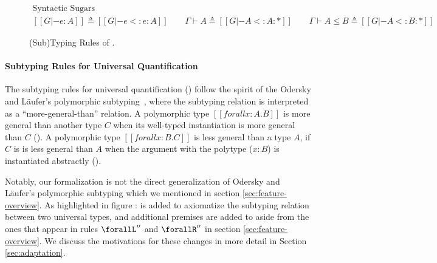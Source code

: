 \begin{figure}
    \setlength{\abovedisplayskip}{0pt}
    \setlength{\abovedisplayshortskip}{0pt}
    \begin{gather*}
       \text{Syntactic Sugars} \\
       [[G |- e : A]] \triangleq [[G |- e <: e : A]]
      \qquad \Gamma \vdash A \triangleq [[G |- A <: A : *]]
      \qquad \Gamma \vdash A \le B \triangleq [[G |- A <: B : *]]
    \end{gather*}
    \caption{(Sub)Typing Rules of \name.}
    \label{fig:typing}
\end{figure}

\paragraph{Subtyping Rules for Universal Quantification}
The subtyping rules for universal quantification () follow
the spirit of the Odersky and L\"aufer's polymorphic subtyping~\citep{odersky1996putting,dunfield2013complete},
where the subtyping relation is interpreted as a ``more-general-than'' relation.
A polymorphic type $[[forall x : A. B]]$
is more general than another type $C$ when its well-typed
instantiation is more general than $C$ (). A polymorphic
type $[[forall x : B. C]]$ is less general than a type $A$,
if $C$ is is less general than $A$ when the argument with the polytype ($x:B$)
is instantiated abstractly ().

Notably, our formalization is not the direct generalization of
Odersky and L\"aufer's polymorphic subtyping which we mentioned in section \ref{sec:feature-overview}.
As highlighted in figure \label{fig:typing}:
 is added to axiomatize the subtyping relation between two universal types,
and additional premises are added to  aside from the
ones that appear in rules $\forallL''$ and $\forallR''$ in section \ref{sec:feature-overview}.
We discuss the motivations for these changes in more detail in Section \ref{sec:adaptation}.


